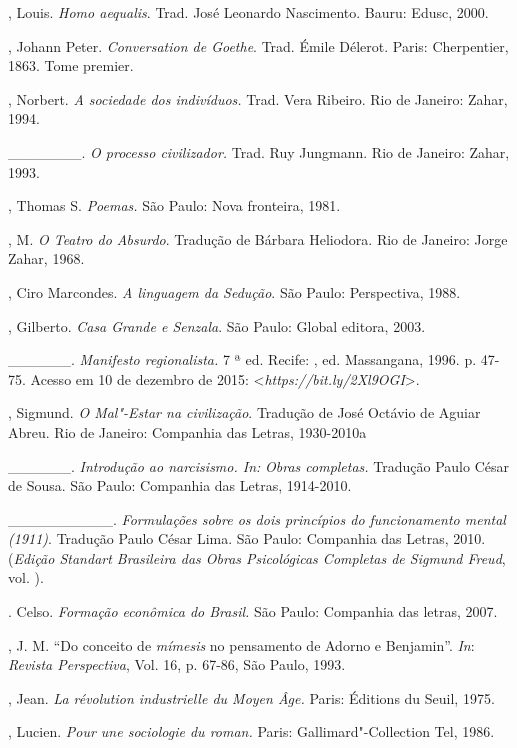 \begin{Parskip}
, Louis. \emph{Homo aequalis}. Trad. José Leonardo Nascimento. Bauru: Edusc, 2000.

, Johann Peter. \emph{Conversation de Goethe}. Trad. Émile
Délerot. Paris: Cherpentier, 1863. Tome premier.

, Norbert. \emph{A sociedade dos indivíduos.} Trad. Vera Ribeiro.
Rio de Janeiro: Zahar, 1994.

\_\_\_\_\_\_\_. \emph{O processo civilizador.} Trad. Ruy Jungmann. Rio de Janeiro: Zahar, 1993.

, Thomas S. \emph{Poemas.} São Paulo: Nova fronteira, 1981.

, M. \emph{O Teatro do Absurdo}. Tradução de Bárbara
Heliodora. Rio de Janeiro: Jorge Zahar, 1968.

, Ciro Marcondes. \emph{A linguagem da Sedução}. São Paulo:
Perspectiva, 1988.

, Gilberto. \emph{Casa Grande e Senzala}. São Paulo: Global
editora, 2003.

\_\_\_\_\_\_. \emph{Manifesto regionalista.} 7 ª ed. Recife: ,
ed. Massangana, 1996. p. 47-75. Acesso em 10 de dezembro de 2015:
\textless{}\emph{https://bit.ly/2Xl9OGI}\textgreater{}.

, Sigmund. \emph{O Mal"-Estar na civilização}. Tradução de
José Octávio de Aguiar Abreu. Rio de Janeiro: Companhia das Letras,
1930-2010a

\_\_\_\_\_\_. \emph{Introdução ao narcisismo. In:} \emph{Obras
completas.} Tradução Paulo César de Sousa. São Paulo: Companhia das
Letras, 1914-2010.

\_\_\_\_\_\_\_\_\_\_. \emph{Formulações sobre os dois princípios do
funcionamento mental (1911)}. Tradução Paulo César Lima. São Paulo:
Companhia das Letras, 2010. (\emph{Edição Standart Brasileira das Obras
Psicológicas Completas de Sigmund Freud}, vol. ).

. Celso. \emph{Formação econômica do Brasil.} São Paulo:
Companhia das letras, 2007.

, J. M. ``Do conceito de \emph{mímesis} no pensamento de Adorno e
Benjamin''. \emph{In}: \emph{Revista Perspectiva}, Vol. 16, p. 67-86, São Paulo, 1993.

, Jean. \emph{La révolution industrielle du Moyen Âge.} Paris:
Éditions du Seuil, 1975.

, Lucien. \emph{Pour une sociologie du roman.} Paris:
Gallimard"-Collection Tel, 1986.


\end{Parskip}
